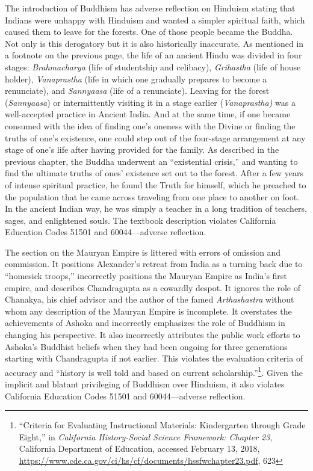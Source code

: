 The introduction of Buddhism has adverse reflection on Hinduism stating that Indians were unhappy with Hinduism and wanted a simpler spiritual faith, which caused them to leave for the forests. One of those people became the Buddha. Not only is this derogatory but it is also historically inaccurate. As mentioned in a footnote on the previous page, the life of an ancient Hindu was divided in four stages: \textit{Brahmacharya}  (life of studentship and celibacy), \textit{Grihastha}  (life of house holder), \textit{Vanaprastha}  (life in which one gradually prepares to become a renunciate), and \textit{Sannyaasa}  (life of a renunciate). Leaving for the forest (\textit{Sannyaasa}) or intermittently visiting it in a stage earlier (\textit{Vanaprastha)}  was a well-accepted practice in Ancient India. And at the same time, if one became consumed with the idea of finding one’s oneness with the Divine or finding the truths of one’s existence, one could step out of the four-stage arrangement at any stage of one’s life after having provided for the family. As described in the previous chapter, the Buddha underwent an “existential crisis,” and wanting to find the ultimate truths of ones’ existence set out to the forest. After a few years of intense spiritual practice, he found the Truth for himself, which he preached to the population that he came across traveling from one place to another on foot. In the ancient Indian way, he was simply a teacher in a long tradition of teachers, sages, and enlightened souls. The textbook description violates California Education Codes 51501 and 60044—adverse reflection.  

The section on the Mauryan Empire is littered with errors of omission and commission. It positions Alexander’s retreat from India as a turning back due to “homesick troops,” incorrectly positions the Mauryan Empire as India’s first empire, and describes Chandragupta as a cowardly despot. It ignores the role of Chanakya, his chief advisor and the author of the famed \textit{Arthashastra}  without whom any description of the Mauryan Empire is incomplete. It overstates the achievements of Ashoka and incorrectly emphasizes the role of Buddhism in changing his perspective. It also incorrectly attributes the public work efforts to Ashoka’s Buddhist beliefs when they had been ongoing for three generations starting with Chandragupta if not earlier. This violates the evaluation criteria of accuracy and “history is well told and based on current scholarship.”\footnote{“Criteria for Evaluating Instructional Materials: Kindergarten through Grade Eight,” in \textit{California History-Social Science Framework: Chapter 23}, California Department of Education, accessed February 13, 2018, \url{https://www.cde.ca.gov/ci/hs/cf/documents/hssfwchapter23.pdf}, 623}. Given the implicit and blatant privileging of Buddhism over Hinduism, it also violates California Education Codes 51501 and 60044—adverse reflection.  

